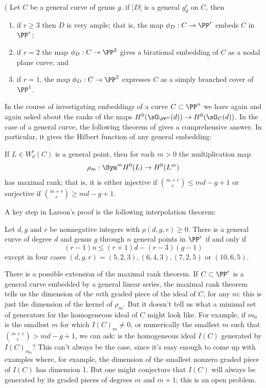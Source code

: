 \begin{theorem}\label{grd omnibus}(\cite[Proposition 5.4]{Eisenbud-Harris83}
Let $C$ be a general curve of genus $g$.
 if $|D|$ is a general $g^r_d$ on $C$, then

 \begin{enumerate}
\item if $r \geq 3$ then $D$ is very ample; that is, the map $\phi_D : C \to \PP^r$   embeds $C$ in $\PP^r$;
\item if $r=2$ the map $\phi_D : C \to \PP^2$ gives a birational embedding of $C$ as a nodal plane curve; and 
\item if $r=1$, the map $\phi_D : C \to \PP^2$ expresses $C$ as a simply branched cover of $\PP^1$.
\end{enumerate}
\end{theorem}



In the course of investigating embeddings of a curve $C\subset \PP^n$ we have again and again
asked about the ranks of the maps $H^0(\sO_{\PP^n}(d)) \to H^0(\sO_C(d))$. In the case of
a general curve, the following theorem of \cite{ELarson2018} gives a comprehensive answer. In particular, it gives
 the Hilbert function of any general embedding:
 
\begin{theorem}[Larson]\label{maximal rank}
If $L \in W^r_d(C)$ is a general point, then for each $m > 0$ the multiplication map
$$
\rho_m : \Sym^m H^0(L) \to H^0(L^m)
$$
has maximal rank; that is, it is either injective if $\binom{m+r}{r} \leq md-g+1$ or surjective if $\binom{m+r}{r} \geq md-g+1$.
\end{theorem}

A key step in Larson's proof is the following interpolation theorem:

\begin{theorem}\label{Larson-Vogt}
Let $d, g$ and $r$
be nonnegative integers with $\rho(d, g, r) \geq 0$. There is a general curve of degree $d$ and genus $g$ through $n$ general
points in $\PP^r$
if and only if
$$
(r-1)n \leq (r + 1)d-(r-3)(g-1)
$$
except in four cases $(d, g, r) = (5, 2, 3),(6, 4, 3),(7, 2, 5)$ or $(10, 6, 5)$.

 \end{theorem}
 
There is a possible extension of the maximal rank theorem. If $C \subset \PP^r$ is a general curve embedded by a general linear series, the maximal rank theorem tells us the dimension of the $m$th graded piece of the ideal of $C$, for any $m$: this is just the dimension of the kernel of $\rho_m$. But it doesn't tell us what a minimal set of generators for the homogeneous ideal of $C$ might look like. For example, if $m_0$ is the smallest $m$ for which $I(C)_m \neq 0$, or numerically the smallest $m$ such that $\binom{m+r}{r} > md-g+1$, we can ask: is the homogeneous ideal $I(C)$ generated by $I(C)_{m_0}$? This can't always be the case, since it's easy enough to come up with examples where, for example, the dimension of the smallest nonzero graded piece of $I(C)$ has dimension 1. But one might conjecture that $I(C)$ will always be generated by its graded pieces of degrees $m$ and $m+1$; this is an open problem.

